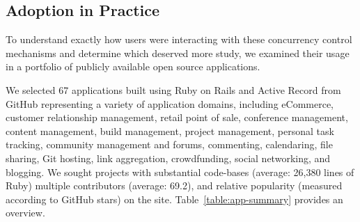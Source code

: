 \subsection{Adoption in Practice}

To understand exactly how users were interacting with these
concurrency control mechanisms and determine which deserved more
study, we examined their usage in a portfolio of publicly available
open source applications.

 We selected 67 applications built using
Ruby on Rails and Active Record from GitHub representing a variety of
application domains, including eCommerce, customer relationship
management, retail point of sale, conference management, content
management, build management, project management, personal task
tracking, community management and forums, commenting, calendaring,
file sharing, Git hosting, link aggregation, crowdfunding, social
networking, and blogging. We sought projects with substantial
code-bases (average: 26,380 lines of Ruby) multiple contributors
(average: 69.2), and relative popularity (measured according to GitHub
stars) on the site. Table~\ref{table:app-summary} provides an
overview.


